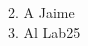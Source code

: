 \documentclass[
12pt, %
spanish, %
singlespacing, %
headsepline, %
]{MastersDoctoralThesis} %
\begin{document}
\begin{acknowledgements}

2. A Jaime\\


3. Al Lab25\\






\end{acknowledgements}
\end{document}
